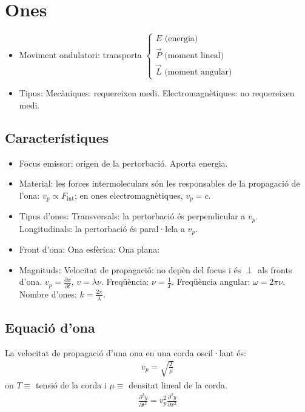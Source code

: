 \section{Ones}
\begin{itemize}
    \item Moviment ondulatori: transporta $\begin{cases} E \text{ (energia)} \\ \vec{P} \text{ (moment lineal)} \\ \vec{L} \text{ (moment angular)} \end{cases}$
    \item Tipus:
        \subitem Mecàniques: requereixen medi.
        \subitem Electromagnètiques: no requereixen medi.
\end{itemize}

\subsection{Característiques}
\begin{itemize}
    \item Focus emissor: origen de la pertorbació. Aporta energia.
    \item Material: les forces intermoleculars són les responsables de la propagació de l'ona: $v_{p} \propto F_{\text{int}}$; en ones electromagnètiques, $v_{p} = c$.
    \item Tipus d'ones:
        \subitem Transversals: la pertorbació és perpendicular a $v_{p}$.
        \subitem Longitudinals: la pertorbació és paral·lela a $v_{p}$.
    \item Front d'ona:
        \subitem Ona esfèrica:
        \subitem Ona plana:
    \item Magnituds:
        \subitem Velocitat de propagació: no depèn del focus i és $\perp$ als fronts d'ona. $\boxed{v_{p} = \frac{\partial x}{\partial t}}$, $\boxed{v = \lambda \nu}$.
        \subitem Freqüència: $\boxed{\nu = \frac{1}{T}}$.
        \subitem Freqüència angular: $\boxed{\omega = 2 \pi \nu}$.
        \subitem Nombre d'ones: $\boxed{k = \frac{2 \pi}{\lambda}}$.
\end{itemize}

\subsection{Equació d'ona}
La velocitat de propagació d'una ona en una corda oscil·lant és:
\begin{align}
    \boxed{v_{p} = \sqrt{\frac{T}{\mu}}}
\end{align}
on $T \equiv$ tensió de la corda i $\mu \equiv$ densitat lineal de la corda.
\begin{align}
    \boxed{\frac{\partial^{2} y}{\partial t^{2}} = v_{p}^{2} \frac{\partial^{2} y}{\partial x^{2}}}
\end{align}


